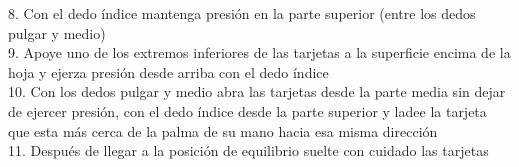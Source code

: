 \documentclass{article}
\begin{document}
8.	Con el dedo índice mantenga presión en la parte superior (entre los dedos pulgar y medio)\\


9.	Apoye uno de los extremos inferiores de las tarjetas a la superficie encima de la hoja y ejerza presión desde arriba con el dedo índice\\


10.	Con los dedos pulgar y medio abra las tarjetas desde la parte media sin dejar de ejercer presión, con el dedo índice desde la parte superior y ladee la tarjeta que esta más cerca de la palma de su mano hacia esa misma dirección\\ 


11.	Después de llegar a la posición de equilibrio suelte con cuidado las tarjetas\\
\end{document}
